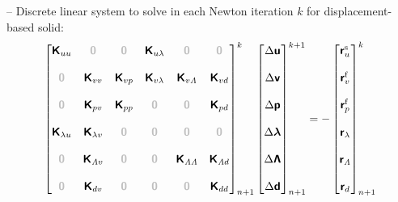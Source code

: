 \documentclass[a4paper,12pt]{report}
\newcommand{\bs}[1]{\boldsymbol{#1}}
\newcommand{\zerom}{\textcolor{lightgray}{\bs{\mathsf{0}}}}
\newcommand{\ROP}{\bs{\mathsf{r}}}
\newcommand{\LM}{\bs{\mathsf{\lambda}}}
\newcommand{\LMZ}{\bs{\mathsf{\Lambda}}}
\newcommand{\lmi}{\lambda} %
\newcommand{\lmzi}{\mathit{\Lambda}} %
\begin{document}
-- Discrete linear system to solve in each Newton iteration $k$ for displacement-based solid:
\begin{equation}
\label{equation-lin-sys-fsi-0d}
\begin{aligned}
\begin{bmatrix} \bs{\mathsf{K}}_{uu} & \zerom & \zerom & \bs{\mathsf{K}}_{u\lmi} & \zerom & \zerom \\ \\ \zerom & \bs{\mathsf{K}}_{vv} & \bs{\mathsf{K}}_{vp} & \bs{\mathsf{K}}_{v\lmi} & \bs{\mathsf{K}}_{v\lmzi} & \bs{\mathsf{K}}_{vd} \\ \\ \zerom & \bs{\mathsf{K}}_{pv} & \bs{\mathsf{K}}_{pp} & \zerom & \zerom & \bs{\mathsf{K}}_{pd} \\ \\ \bs{\mathsf{K}}_{\lmi u} & \bs{\mathsf{K}}_{\lmi v} & \zerom & \zerom & \zerom & \zerom \\ \\ \zerom & \bs{\mathsf{K}}_{\lmzi v} & \zerom & \zerom & \bs{\mathsf{K}}_{\lmzi \lmzi} & \bs{\mathsf{K}}_{\lmzi d} \\ \\ \zerom &  \bs{\mathsf{K}}_{dv}  & \zerom & \zerom & \zerom & \bs{\mathsf{K}}_{dd} \end{bmatrix}_{n+1}^{k}\begin{bmatrix} \Delta\bs{\mathsf{u}} \\ \\ \Delta\bs{\mathsf{v}} \\ \\ \Delta\bs{\mathsf{p}} \\ \\ \Delta\LM \\ \\ \Delta\LMZ \\ \\ \Delta\bs{\mathsf{d}} \end{bmatrix}_{n+1}^{k+1}=-\begin{bmatrix} \ROP_{u}^{\mathrm{s}} \\ \\ \ROP_{v}^{\mathrm{f}} \\ \\ \ROP_{p}^{\mathrm{f}} \\ \\ \ROP_{\lmi} \\ \\ \ROP_{\lmzi} \\ \\ \ROP_{d}\end{bmatrix}_{n+1}^{k}
\end{aligned}
\end{equation}
\end{document}

